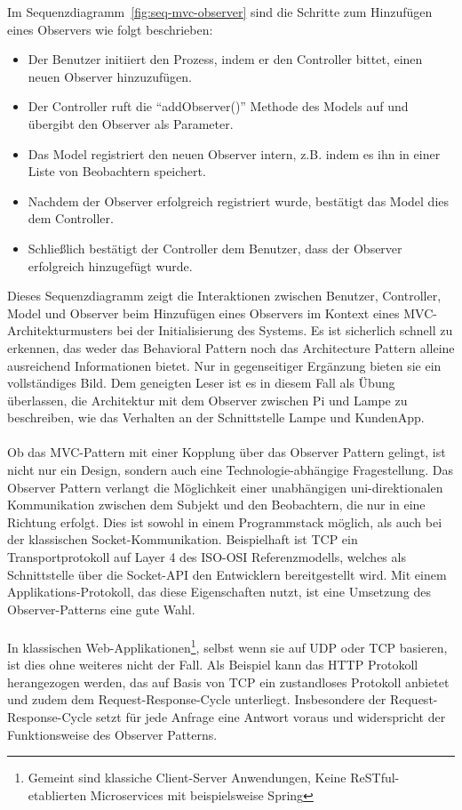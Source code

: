 \documentclass[../vs-script-first-v01.tex]{subfiles}
\begin{document}
Im Sequenzdiagramm~\ref{fig:seq-mvc-observer} sind die Schritte zum Hinzufügen eines Observers wie folgt beschrieben:
\begin{itemize}
\item Der Benutzer initiiert den Prozess, indem er den Controller bittet, einen neuen Observer hinzuzufügen.
\item Der Controller ruft die \enquote{addObserver()} Methode des Models auf und übergibt den Observer als Parameter.
\item Das Model registriert den neuen Observer intern, z.B. indem es ihn in einer Liste von Beobachtern speichert.
\item Nachdem der Observer erfolgreich registriert wurde, bestätigt das Model dies dem Controller.
\item Schließlich bestätigt der Controller dem Benutzer, dass der Observer erfolgreich hinzugefügt wurde.
\end{itemize}
Dieses Sequenzdiagramm zeigt die Interaktionen zwischen Benutzer, Controller, Model und Observer beim Hinzufügen eines Observers im Kontext eines MVC-Architekturmusters bei der Initialisierung des Systems. Es ist sicherlich schnell zu erkennen, das weder das Behavioral Pattern noch das Architecture Pattern alleine ausreichend Informationen bietet. Nur in gegenseitiger Ergänzung bieten sie ein vollständiges Bild. Dem geneigten Leser ist es in diesem Fall als Übung überlassen, die Architektur mit dem Observer zwischen Pi und Lampe zu beschreiben, wie das Verhalten an der Schnittstelle Lampe und KundenApp. 
\\\\
Ob das MVC-Pattern mit einer Kopplung über das Observer Pattern gelingt, ist nicht nur ein Design, sondern auch eine Technologie-abhängige Fragestellung. Das Observer Pattern verlangt die Möglichkeit einer unabhängigen uni-direktionalen Kommunikation zwischen dem Subjekt und den Beobachtern, die nur in eine Richtung erfolgt. Dies ist sowohl in einem Programmstack möglich, als auch bei der klassischen Socket-Kommunikation. Beispielhaft ist TCP ein Transportprotokoll auf Layer 4 des ISO-OSI Referenzmodells, welches als Schnittstelle über die Socket-API den Entwicklern bereitgestellt wird. Mit einem Applikations-Protokoll, das diese Eigenschaften nutzt, ist eine Umsetzung des Observer-Patterns eine gute Wahl. 
\\\\
In klassischen Web-Applikationen\footnote{Gemeint sind klassiche Client-Server Anwendungen, Keine ReSTful-etablierten Microservices mit beispielsweise Spring}, selbst wenn sie auf UDP oder TCP basieren, ist dies ohne weiteres nicht der Fall. Als Beispiel kann das HTTP Protokoll herangezogen werden, das auf Basis von TCP ein zustandloses Protokoll anbietet und zudem dem Request-Response-Cycle unterliegt. Insbesondere der Request-Response-Cycle setzt für jede Anfrage eine Antwort voraus und widerspricht der Funktionsweise des Observer Patterns.
\end{document}
